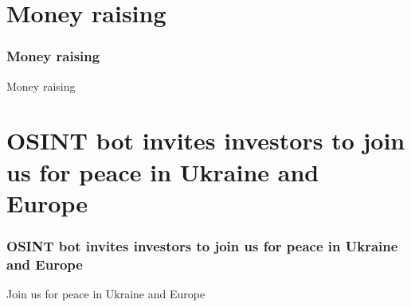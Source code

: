 \documentclass{beamer}
\begin{document}
\section{Money raising}

\begin{frame}
    \frametitle{Money raising}
    
    \begin{block}{Money raising}
    \end{block}
    
\end{frame}


\section{OSINT bot invites investors to join us for peace in Ukraine and Europe}

\begin{frame}
    \frametitle{OSINT bot invites investors to join us for peace in Ukraine and Europe}
    
    \begin{block}{Join us for peace in Ukraine and Europe}
    \end{block}
    
\end{frame}
\end{document}
